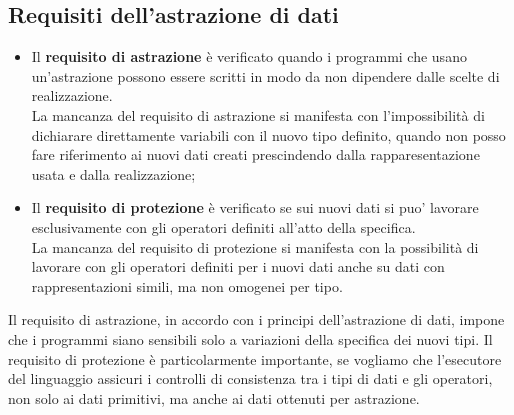 \documentclass[12pt]{report}
\begin{document}
	\subsection{Requisiti dell'astrazione di dati}
	\begin{itemize}
		\item Il \textbf{requisito di astrazione} è verificato quando i programmi che usano un'astrazione possono essere scritti in modo da non dipendere dalle scelte di realizzazione. \\
		La mancanza del requisito di astrazione si manifesta con l'impossibilità di dichiarare direttamente variabili con il nuovo tipo definito, quando non posso fare riferimento ai nuovi dati creati prescindendo dalla rapparesentazione usata e dalla realizzazione;
		\item Il \textbf{requisito di protezione} è verificato se sui nuovi dati si puo' lavorare esclusivamente con gli operatori definiti all'atto della specifica. \\
		La mancanza del requisito di protezione si manifesta con la possibilità di lavorare con gli operatori definiti per i nuovi dati anche su dati con rappresentazioni simili, ma non omogenei per tipo.
	\end{itemize}
	Il requisito di astrazione, in accordo con i principi dell'astrazione di dati, impone che i programmi siano sensibili solo a variazioni della specifica dei nuovi tipi. Il requisito di protezione è particolarmente importante, se vogliamo che l'esecutore del linguaggio assicuri i controlli di consistenza tra i tipi di dati e gli operatori, non solo ai dati primitivi, ma anche ai dati ottenuti per astrazione.
\end{document}

